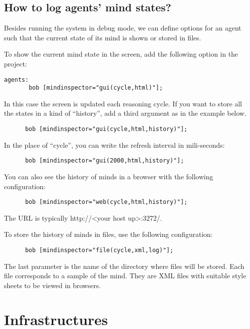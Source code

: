 \documentclass{article}
\newcommand{\jason}[0]{\htlink{\textit{Jason}}{http://jason.sf.net}\xspace}
\begin{document}
\subsection{How to log agents' mind states?}

Besides running the system in debug mode, we can define options for an
agent such that the current state of its mind is shown or stored in
files.

To show the current mind state in the screen, add the following option
in the project:
\begin{verbatim}
agents:
       bob [mindinspector="gui(cycle,html)"];
\end{verbatim}

In this case the screen is updated each reasoning cycle. If you want
to store all the states in a kind of ``history'', add a third argument
as in the example below.

\begin{verbatim}
      bob [mindinspector="gui(cycle,html,history)"];
\end{verbatim}

In the place of ``cycle'', you can write the refresh interval in
mili-seconds:

\begin{verbatim}
      bob [mindinspector="gui(2000,html,history)"];
\end{verbatim}


You can also see the history of minds in a browser with the following configuration:
\begin{verbatim}
      bob [mindinspector="web(cycle,html,history)"];
\end{verbatim}
The URL is typically http://<your host up>:3272/.

To store the history of minds in files, use the following configuration:
\begin{verbatim}
      bob [mindinspector="file(cycle,xml,log)"];
\end{verbatim}
The last parameter is the name of the directory where files will be
stored. Each file corresponds to a sample of the mind. They are XML
files with suitable style sheets to be viewed in browsers.



\section{\jason Infrastructures}
\end{document}

